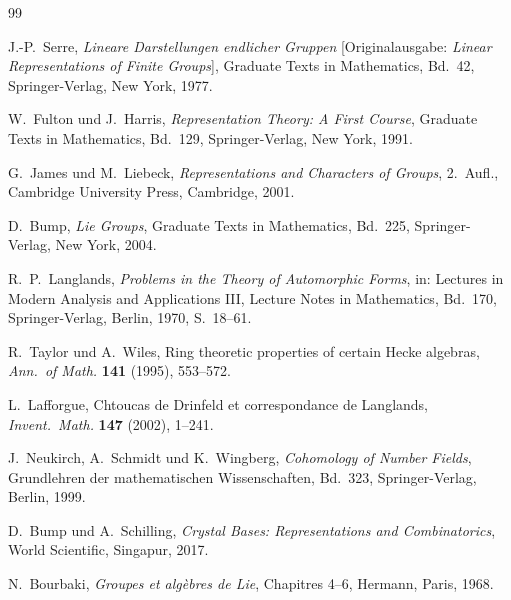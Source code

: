 \documentclass[12pt,a4paper]{amsart}
\theoremstyle{definition}
\begin{document}
\begin{thebibliography}{99}

J.-P.\ Serre,
\textit{Lineare Darstellungen endlicher Gruppen}
[Originalausgabe: \textit{Linear Representations of Finite Groups}],
Graduate Texts in Mathematics, Bd.~42,
Springer-Verlag, New York, 1977.

W.\ Fulton und J.\ Harris,
\textit{Representation Theory: A First Course},
Graduate Texts in Mathematics, Bd.~129,
Springer-Verlag, New York, 1991.

G.\ James und M.\ Liebeck,
\textit{Representations and Characters of Groups},
2.\ Aufl., Cambridge University Press, Cambridge, 2001.

D.\ Bump,
\textit{Lie Groups},
Graduate Texts in Mathematics, Bd.~225,
Springer-Verlag, New York, 2004.

R.\ P.\ Langlands,
\textit{Problems in the Theory of Automorphic Forms},
in: Lectures in Modern Analysis and Applications III,
Lecture Notes in Mathematics, Bd.~170,
Springer-Verlag, Berlin, 1970, S.~18--61.

R.\ Taylor und A.\ Wiles,
Ring theoretic properties of certain Hecke algebras,
\textit{Ann.\ of Math.} \textbf{141} (1995), 553--572.

L.\ Lafforgue,
Chtoucas de Drinfeld et correspondance de Langlands,
\textit{Invent.\ Math.} \textbf{147} (2002), 1--241.

J.\ Neukirch, A.\ Schmidt und K.\ Wingberg,
\textit{Cohomology of Number Fields},
Grundlehren der mathematischen Wissenschaften, Bd.~323,
Springer-Verlag, Berlin, 1999.

D.\ Bump und A.\ Schilling,
\textit{Crystal Bases: Representations and Combinatorics},
World Scientific, Singapur, 2017.

N.\ Bourbaki,
\textit{Groupes et algèbres de Lie}, Chapitres 4--6,
Hermann, Paris, 1968.

\end{thebibliography}
\end{document}
